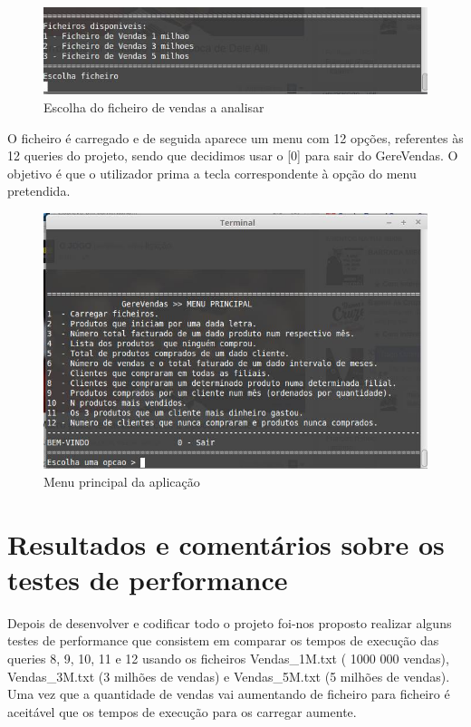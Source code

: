 \begin{figure}[h!]
	\centering
	\includegraphics[scale=0.4]{1querie.png}  
	\caption{Escolha do ficheiro de vendas a analisar}  
\end{figure}

O ficheiro é carregado e de seguida aparece um menu com 12 opções, referentes às 12 queries do projeto, sendo que decidimos usar o [0] para sair do GereVendas. O objetivo é que o utilizador prima a tecla correspondente à opção do menu pretendida.

\begin{figure}[h!]
	\centering
	\includegraphics[scale=0.6]{menu.png}  
	\caption{Menu principal da aplicação}  
\end{figure}


\chapter{Resultados e comentários sobre os testes de performance}
Depois de desenvolver e codificar todo o projeto foi-nos proposto realizar alguns testes de performance que consistem em comparar os tempos de execução das queries 8, 9, 10, 11 e 12 usando os ficheiros Vendas\_1M.txt ( 1000 000 vendas), Vendas\_3M.txt (3 milhões de vendas) e Vendas\_5M.txt (5 milhões de vendas).
Uma vez que a quantidade de vendas vai aumentando de ficheiro para ficheiro é aceitável que os tempos de execução para os carregar aumente.


